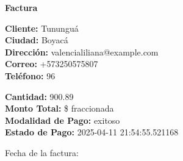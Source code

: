 \documentclass{article}
\begin{document}
\begin{center}
    {\LARGE \textbf{Factura}}\\[1cm]
\end{center}

\textbf{Cliente:} Tununguá \\
\textbf{Ciudad:} Boyacá \\
\textbf{Dirección:} valencialiliana@example.com \\
\textbf{Correo:} +573250575807 \\
\textbf{Teléfono:} 96 \\

\vspace{0.5cm}

\textbf{Cantidad:} 900.89 \\
\textbf{Monto Total:} \$ fraccionada \\
\textbf{Modalidad de Pago:} exitoso \\
\textbf{Estado de Pago:} 2025-04-11 21:54:55.521168 \\

\vspace{1cm}

Fecha de la factura: 
\end{document}
